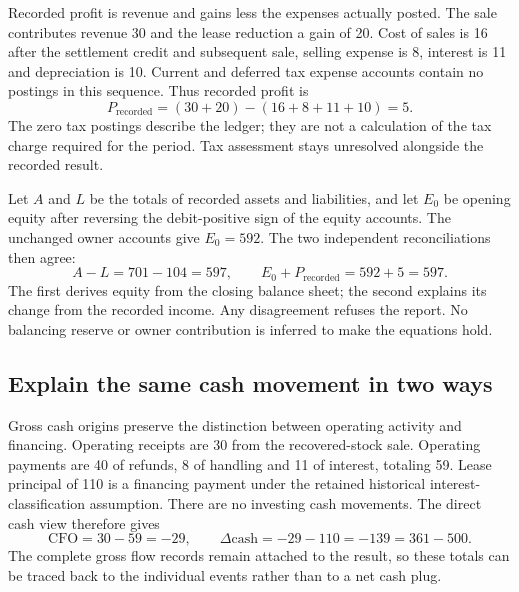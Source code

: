 Recorded profit is revenue and gains less the expenses actually posted. The
sale contributes revenue 30 and the lease reduction a gain of 20. Cost of sales
is 16 after the settlement credit and subsequent sale, selling expense is 8,
interest is 11 and depreciation is 10. Current and deferred tax expense accounts
contain no postings in this sequence. Thus recorded profit is
\[
 P_{\mathrm{recorded}}=(30+20)-(16+8+11+10)=5.
\]
The zero tax postings describe the ledger; they are not a calculation of the
tax charge required for the period. Tax assessment stays unresolved alongside
the recorded result.

Let $A$ and $L$ be the totals of recorded assets and liabilities, and let $E_0$
be opening equity after reversing the debit-positive sign of the equity
accounts. The unchanged owner accounts give $E_0=592$. The two independent
reconciliations then agree:
\[
 A-L=701-104=597,
 \qquad E_0+P_{\mathrm{recorded}}=592+5=597.
\]
The first derives equity from the closing balance sheet; the second explains
its change from the recorded income. Any disagreement refuses the report. No
balancing reserve or owner contribution is inferred to make the equations hold.

\subsection{Explain the same cash movement in two ways}

Gross cash origins preserve the distinction between operating activity and
financing. Operating receipts are 30 from the recovered-stock sale. Operating
payments are 40 of refunds, 8 of handling and 11 of interest, totaling 59.
Lease principal of 110 is a financing payment under the retained historical
interest-classification assumption. There are no investing cash movements.
The direct cash view therefore gives
\[
 \mathrm{CFO}=30-59=-29,\qquad
 \Delta\mathrm{cash}=-29-110=-139=361-500.
\]
The complete gross flow records remain attached to the result, so these totals
can be traced back to the individual events rather than to a net cash plug.

